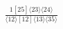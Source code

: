 \documentclass[varwidth, border=5pt]{standalone}
\begin{document}
\begin{my}
$\begin{gathered}
\scriptscriptstyle\frac{1[25]⟨23⟩⟨24⟩}{⟨12⟩[12]⟨13⟩⟨35⟩}
\end{gathered}$
\end{my}
\end{document}
